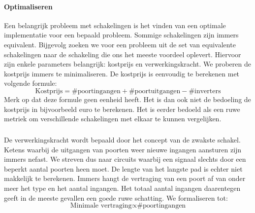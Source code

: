 \paragraph{Optimaliseren}
Een belangrijk probleem met schakelingen is het vinden van een optimale implementatie voor een bepaald probleem. Sommige schakelingen zijn immers equivalent. Bijgevolg zoeken we voor een probleem uit de set van equivalente schakelingen naar de schakeling die ons het meeste voordeel oplevert. Hiervoor zijn enkele parameters belangrijk: kostprijs en verwerkingskracht. We proberen de kostprijs immers te minimaliseren. De kostprijs is eenvoudig te berekenen met volgende formule:
\begin{equation}
\mbox{Kostprijs}=\mbox{\#poortingangen}+\mbox{\#poortuitgangen}-\mbox{\#inverters}
\label{eqn:kosten}
\end{equation}
Merk op dat deze formule geen eenheid heeft. Het is dan ook niet de bedoeling de kostprijs in bijvoorbeeld euro te berekenen. Het is eerder bedoeld als een ruwe metriek om verschillende schakelingen met elkaar te kunnen vergelijken.
\subparagraph{}
De verwerkingskracht wordt bepaald door het concept van de zwakste schakel. Ketens waarbij de uitgangen van poorten weer nieuwe ingangen aansturen zijn immers nefast. We streven dus naar circuits waarbij een signaal slechts door een beperkt aantal poorten heen moet. De lengte van het langste pad is echter niet makkelijk te berekenen. Immers hangt de vertraging van een poort af van onder meer het type en het aantal ingangen. Het totaal aantal ingangen daarentegen geeft in de meeste gevallen een goede ruwe schatting. We formaliseren tot:
\begin{equation}
\mbox{Minimale vertraging}\propto\mbox{\#poortingangen}
\end{equation}
